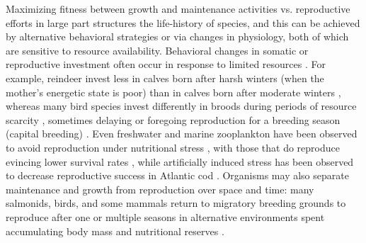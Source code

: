 \documentclass{pnastwo}
\begin{document}
\begin{article}
Maximizing fitness between growth and maintenance activities vs. reproductive efforts in large part structures the life-history of species, and this can be achieved by alternative behavioral strategies or via changes in physiology, both of which are sensitive to resource availability.
Behavioral changes in somatic or reproductive investment often occur in response to limited resources \cite{Morris:1987eo}.
For example, reindeer invest less in calves born after harsh winters (when the mother's energetic state is poor) than in calves born after moderate winters \cite{Tveraa:2003fq}, whereas many bird species invest differently in broods during periods of resource scarcity \cite{Daan:1988va,Jacot:2009dv}, sometimes delaying or foregoing reproduction for a breeding season (capital breeding) \cite{Martin:1987dl,Stearns:1989ip,Barboza:2002in}.
Even freshwater and marine zooplankton have been observed to avoid reproduction under nutritional stress \cite{Threlkeld:1976ih}, with those that do reproduce evincing lower survival rates \cite{Kirk:1997cc}, while artificially induced stress has been observed to decrease reproductive success in Atlantic cod \cite{Morgan:1999do}.
Organisms may also separate maintenance and growth from reproduction over space and time: 
many salmonids, birds, and some mammals return to migratory breeding grounds to reproduce after one or multiple seasons in alternative environments spent accumulating body mass and nutritional reserves \cite{Weber:1998jg,Mduma:1999cp,Moore:2014hi}.



\end{article}
\end{document}
